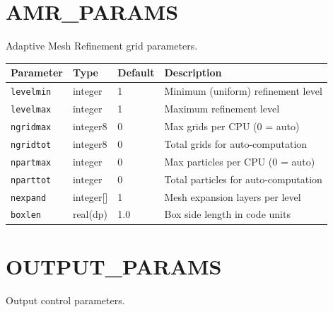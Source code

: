 \documentclass[11pt,fleqn]{book}
\begin{document}
\chapter{AMR\_PARAMS}

Adaptive Mesh Refinement grid parameters.

\begin{longtable}{L{3.5cm} C{1.8cm} C{1.8cm} L{6cm}}
\toprule
\textbf{Parameter} & \textbf{Type} & \textbf{Default} & \textbf{Description} \\
\midrule
\endhead
\texttt{levelmin} & integer & 1 & Minimum (uniform) refinement level \\
\texttt{levelmax} & integer & 1 & Maximum refinement level \\
\texttt{ngridmax} & integer8 & 0 & Max grids per CPU (0 = auto) \\
\texttt{ngridtot} & integer8 & 0 & Total grids for auto-computation \\
\texttt{npartmax} & integer & 0 & Max particles per CPU (0 = auto) \\
\texttt{nparttot} & integer & 0 & Total particles for auto-computation \\
\texttt{nexpand} & integer[] & 1 & Mesh expansion layers per level \\
\texttt{boxlen} & real(dp) & 1.0 & Box side length in code units \\
\bottomrule
\end{longtable}


\chapter{OUTPUT\_PARAMS}

Output control parameters.
\end{document}
